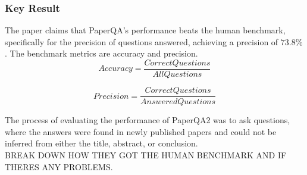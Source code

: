 \subsubsection{Key Result}
The paper claims that PaperQA's performance beats the human benchmark, specifically for the precision of questions answered, achieving a precision of $73.8\%$. The benchmark metrics are accuracy and precision. \\

\begin{equation}
    Accuracy = \frac{Correct Questions}{All Questions}
\end{equation}


\begin{equation}
    Precision = \frac{Correct Questions}{Answered Questions}
\end{equation}

The process of evaluating the performance of PaperQA2 was to ask questions, where the answers were found in newly published papers and could not be inferred from either the title, abstract, or conclusion. \\

BREAK DOWN HOW THEY GOT THE HUMAN BENCHMARK AND IF THERES ANY PROBLEMS. 

